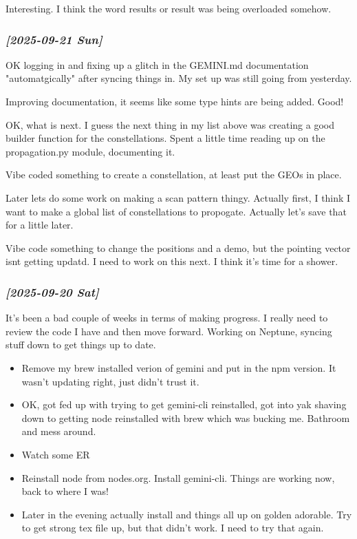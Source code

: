 \documentclass[11pt]{article}
\begin{document}
Interesting.  I think the word results or result was being overloaded somehow.

\subsubsection{\textit{[2025-09-21 Sun]}}
\label{sec:orgc8cbe0c}
OK logging in and fixing up a glitch in the GEMINI.md documentation "automatgically"
after syncing things in.  My set up was still going from yesterday.

Improving documentation, it seems like some type hints are being added.  Good!

OK, what is next.  I guess the next thing in my list above was creating a good builder
function for the constellations.  Spent a little time reading up on the propagation.py
module, documenting it. 

Vibe coded something to create a constellation, at least put the GEOs in place.

Later lets do some work on making a scan pattern thingy. Actually first,
I think I want to make a global list of constellations to propogate.  Actually
let's save that for a little later.

Vibe code something to change the positions and a demo, but the pointing vector isnt
getting updatd. I need to work on this next.  I think it's time for a shower.


\subsubsection{\textit{[2025-09-20 Sat]}}
\label{sec:org9422229}
It's been a bad couple of weeks in terms of making progress.  I really need to review
the code I have and then move forward. Working on Neptune, syncing stuff down to
get things up to date.
\begin{itemize}
\item Remove my brew installed verion of gemini and put in the npm version.
It wasn't updating right, just didn't trust it.
\item OK, got fed up with trying to get gemini-cli reinstalled, got into yak shaving down to getting node reinstalled with brew which was bucking me.  Bathroom and mess around.
\item Watch some ER
\item Reinstall node from nodes.org.   Install gemini-cli.  Things are working now, back to where I was!

\item Later in the evening actually install and things all up on golden adorable.  Try to get
strong tex file up, but that didn't work.  I need to try that again.
\end{itemize}
\end{document}
